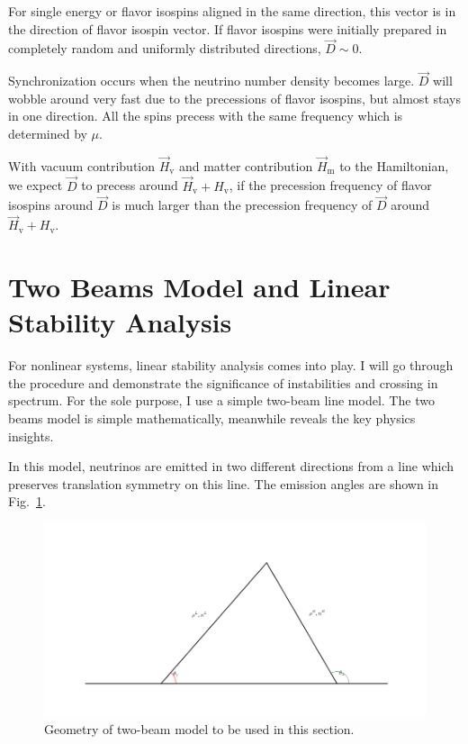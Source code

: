 For single energy or flavor isospins aligned in the same direction, this vector is in the direction of flavor isospin vector. If flavor isospins were initially prepared in completely random and uniformly distributed directions, $\vec D\sim 0$.

Synchronization occurs when the neutrino number density becomes large. $\vec D$ will wobble around very fast due to the precessions of flavor isospins, but almost stays in one direction. All the spins precess with the same frequency which is determined by $\mu$.

With vacuum contribution $\vec H_{\mathrm v}$ and matter contribution $\vec H_{\mathrm m}$ to the Hamiltonian, we expect $\vec D$ to precess around $\vec H_{\mathrm v} + H_{\mathrm v}$, if the precession frequency of flavor isospins around $\vec D$ is much larger than the precession frequency of $\vec D$ around  $\vec H_{\mathrm v} + H_{\mathrm v}$.





\section{\label{chap:dr-sec:two-beams}Two Beams Model and Linear Stability Analysis}

For nonlinear systems, linear stability analysis comes into play. I will go through the procedure and demonstrate the significance of instabilities and crossing in spectrum. For the sole purpose, I use a simple two-beam line model. The two beams model is simple mathematically, meanwhile reveals the key physics insights.

In this model, neutrinos are emitted in two different directions from a line which preserves translation symmetry on this line. The emission angles are shown in Fig.~\ref{chap:dr-sec:two-beams-fig:two-beam-line-model}.

\begin{figure}[htbp]
    \centering
    \includegraphics[width=\textwidth]{chapters/assets/dr/two-beam-line-model.png}
    \caption{Geometry of two-beam model to be used in this section. }
    \label{chap:dr-sec:two-beams-fig:two-beam-line-model}
\end{figure}

